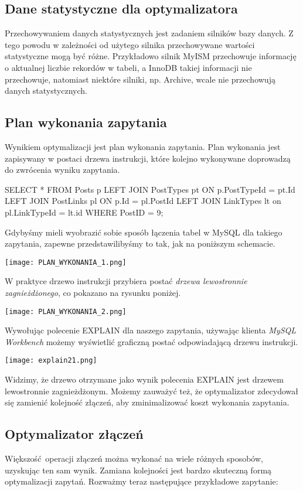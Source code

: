 \subsection{Dane statystyczne dla optymalizatora}
Przechowywaniem danych statystycznych jest zadaniem silników bazy danych. Z tego powodu w zależności od użytego silnika przechowywane wartości statystyczne mogą być różne. Przykładowo silnik MyISM przechowuje informację o aktualnej liczbie rekordów w tabeli, a InnoDB takiej informacji nie przechowuje, natomiast niektóre silniki, np. Archive, wcale nie przechowują danych statystycznych.

\subsection{Plan wykonania zapytania}
Wynikiem optymalizacji jest plan wykonania zapytania. Plan wykonania jest zapisywany w postaci drzewa instrukcji, które kolejno wykonywane doprowadzą do zwrócenia wyniku zapytania.
\begin{spverbatim}
	SELECT * FROM Posts p LEFT JOIN PostTypes pt ON p.PostTypeId = pt.Id LEFT JOIN PostLinks pl ON p.Id = pl.PostId LEFT JOIN LinkTypes lt on pl.LinkTypeId = lt.id WHERE PostID = 9;
\end{spverbatim}
Gdybyśmy mieli wyobrazić sobie sposób łączenia tabel w MySQL dla takiego zapytania, zapewne przedstawilibyśmy to tak, jak na poniższym schemacie.
 \begin{center}
 	\texttt{[image: PLAN\_WYKONANIA\_1.png]} 
 \end{center}
W praktyce drzewo instrukcji przybiera postać \textit{drzewa lewostronnie zagnieżdżonego}, co pokazano na rysunku poniżej.
\begin{center}
	\texttt{[image: PLAN\_WYKONANIA\_2.png]} 
\end{center}
Wywołując polecenie EXPLAIN dla naszego zapytania, używając klienta \textit{MySQL Workbench} możemy wyświetlić graficzną postać odpowiadającą drzewu instrukcji.
\begin{center}
	\texttt{[image: explain21.png]} 
\end{center}
Widzimy, że drzewo otrzymane jako wynik polecenia EXPLAIN jest drzewem lewostronnie zagnieżdżonym. Możemy zauważyć też, że optymalizator zdecydował się zamienić kolejność złączeń, aby zminimalizować koszt wykonania zapytania.

\subsection{Optymalizator złączeń}
Większość operacji złączeń można wykonać na wiele różnych sposobów, uzyskując ten sam wynik. Zamiana kolejności jest bardzo skuteczną formą optymalizacji zapytań. Rozważmy teraz następujące przykładowe zapytanie:

